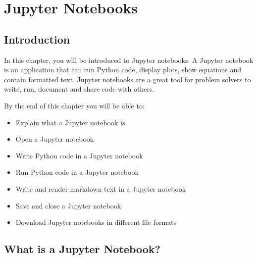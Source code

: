 \documentclass{book}
\begin{document}
    




    
        \hypertarget{jupyter-notebooks}{%
\chapter{Jupyter Notebooks}\label{jupyter-notebooks}}
    




    
        \hypertarget{introduction}{%
\section{Introduction}\label{introduction}}
    




    
        In this chapter, you will be introduced to Jupyter notebooks. A Jupyter
notebook is an application that can run Python code, display plots, show
equations and contain formatted text. Jupyter notebooks are a great tool
for problem solvers to write, run, document and share code with others.

By the end of this chapter you will be able to:

\begin{itemize}
\item
  Explain what a Jupyter notebook is
\item
  Open a Jupyter notebook
\item
  Write Python code in a Jupyter notebook
\item
  Run Python code in a Jupyter notebook
\item
  Write and render markdown text in a Jupyter notebook
\item
  Save and close a Jupyter notebook
\item
  Download Jupyter notebooks in different file formats
\end{itemize}
        \newpage

    




    
        \hypertarget{what-is-a-jupyter-notebook}{%
\section{What is a Jupyter Notebook?}\label{what-is-a-jupyter-notebook}}
    
\end{document}
